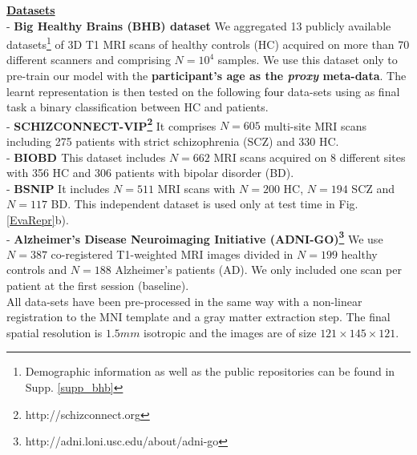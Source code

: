 \documentclass[runningheads]{llncs}
\newcommand{\rebuttal}[1]{\textcolor{black}{#1}}
\begin{document}
\underline{\textbf{Datasets}}\\ - \textbf{Big Healthy Brains (BHB) dataset} We aggregated 13 publicly available datasets\footnote{Demographic information as well as the public repositories can be found in Supp. \ref{supp_bhb}} of 3D T1 MRI scans of healthy controls (HC) acquired on more than 70 different scanners and comprising $N=10^4$ samples. We use this dataset only to pre-train our model with the \textbf{participant's age as the \textit{proxy} meta-data}. The learnt representation is then tested on the following \rebuttal{four} data-sets using as final task a binary classification between HC and patients.\\
- \textbf{SCHIZCONNECT-VIP\footnote{http://schizconnect.org}} It comprises $N=605$ multi-site MRI scans including 275 patients with strict schizophrenia (SCZ) and 330 HC.\\ %
- \textbf{BIOBD  \cite{hozer2020biobd, sarrazin2018}} This dataset includes $N=662$ MRI scans acquired on 8 different sites with 356 HC and 306 patients with bipolar disorder (BD).\\
- \textbf{BSNIP} \cite{tamminga2014bipolar} It includes $N=511$ MRI scans with $N=200$ HC, $N=194$ SCZ and $N=117$ BD. This independent dataset is used only at test time in Fig. \ref{EvaRepr}b). \\
- \textbf{Alzheimer's Disease Neuroimaging Initiative (ADNI-GO)\footnote{http://adni.loni.usc.edu/about/adni-go}} %
We use $N=387$ co-registered T1-weighted MRI images divided in $N=199$ healthy controls and $N=188$ Alzheimer's patients (AD). We only included one scan per patient at the first session (baseline).\\
All data-sets have been pre-processed in the same way with a non-linear registration to the MNI template and a gray matter extraction step. The final spatial resolution is $1.5mm$ isotropic and the images are of size $121\times 145\times 121$. 
\end{document}
